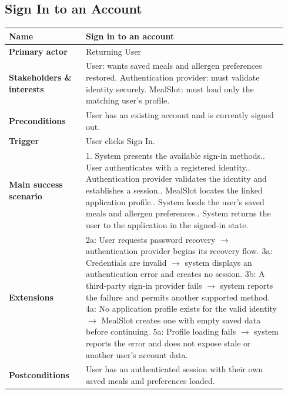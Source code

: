 \documentclass[sigconf]{acmart}
\begin{document}
\subsection*{Sign In to an Account}
{\footnotesize
\begin{supertabular}{@{}p{0.26\linewidth}p{0.68\linewidth}@{}}
\textbf{Name} & Sign in to an account \\
\hline
\textbf{Primary actor} & Returning User \\
\hline
\textbf{Stakeholders \& interests} & User: wants saved meals and allergen preferences restored. Authentication provider: must validate identity securely. MealSlot: must load only the matching user's profile. \\
\hline
\textbf{Preconditions} & User has an existing account and is currently signed out. \\
\hline
\textbf{Trigger} & User clicks Sign In. \\
\hline
\textbf{Main success scenario} & 1. System presents the available sign-in methods.. User authenticates with a registered identity.. Authentication provider validates the identity and establishes a session.. MealSlot locates the linked application profile.. System loads the user's saved meals and allergen preferences.. System returns the user to the application in the signed-in state. \\
\hline
\textbf{Extensions} & 2a: User requests password recovery $\rightarrow$ authentication provider begins its recovery flow.\newline
3a: Credentials are invalid $\rightarrow$ system displays an authentication error and creates no session.\newline
3b: A third-party sign-in provider fails $\rightarrow$ system reports the failure and permits another supported method.\newline
4a: No application profile exists for the valid identity $\rightarrow$ MealSlot creates one with empty saved data before continuing.\newline
5a: Profile loading fails $\rightarrow$ system reports the error and does not expose stale or another user's account data. \\
\hline
\textbf{Postconditions} & User has an authenticated session with their own saved meals and preferences loaded. \\
\end{supertabular}
}
\end{document}
